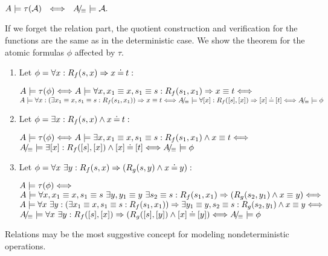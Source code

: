 \begin{THEOREM}\label{th:relcorrect}
$A\models \tau({\cal A})\ \ \mathrel{\Longleftrightarrow}\ \ A\!{\textstyle /}\!_\equiv\models {\cal A}.$ \end{THEOREM}
\begin{PROOF}
If we forget the relation part, the quotient construction and verification for the functions are the same as in the deterministic case. We show the theorem for the atomic formulas $\phi$ affected by $\tau$. \begin{enumerate}\MyLPar
\item Let $\phi = \forall x:R_{f}(s,x)\mathrel\Rightarrow x\mathbin{\doteq} t:$ 

$A\models \tau(\phi) \mathrel{\Longleftrightarrow}
A\models \forall x, x_1\equiv x, s_1\equiv s : R_{f}(s_1,x_1)\mathrel\Rightarrow x\equiv t
\mathrel{\Longleftrightarrow} $\\
$A\models \forall x:(\exists x_1\equiv x,s_1\equiv s : R_{f}(s_1,x_1))\mathrel\Rightarrow x\equiv t \mathrel{\Longleftrightarrow}
A\!{\textstyle /}\!_\equiv\models \forall [x]:R_{f}([s],[x])\mathrel\Rightarrow [x]\mathbin{\doteq} [t] \mathrel{\Longleftrightarrow} A\!{\textstyle /}\!_\equiv\models \phi$
\item Let $\phi = \exists x:R_{f}(s,x)\land x\mathbin{\doteq} t:$ 

$A\models \tau(\phi) \mathrel{\Longleftrightarrow} A\models \exists x, x_1\equiv x, s_1\equiv s: R_{f}(s_1,x_1) \land x\equiv t \mathrel{\Longleftrightarrow} $\\ $A\!{\textstyle /}\!_\equiv \models \exists [x]:R_{f}([s],[x])\land [x]\mathbin{\doteq} [t] \mathrel{\Longleftrightarrow} A\!{\textstyle /}\!_\equiv \models \phi$
\item Let $\phi = \forall x\ \exists y : 
R_{f}(s,x)\mathrel\Rightarrow (R_{g}(s,y)\land x\mathbin{\doteq} y):$ 

$A\models \tau(\phi) \mathrel{\Longleftrightarrow} $\\
$A\models \forall x,x_1\equiv x,s_1\equiv s\ \exists y,y_1\equiv y\ \exists s_2\equiv s :
\Pre Rf(s_1,x_1)\impl (\Pre Rg(s_2,y_1)\land x\equiv y) \ifff $\\ $A\models \forall x\ \exists y :(\exists x_1\equiv x,s_1\equiv s : R_{f}(s_1,x_1))\mathrel\Rightarrow \exists y_1\equiv y,s_2\equiv s : R_{g}(s_2,y_1)\land
x\equiv y \mathrel{\Longleftrightarrow} $\\
$A\!{\textstyle /}\!_\equiv \models \forall x\ \exists y : R_{f}([s],[x])\mathrel\Rightarrow 
(R_{g}([s],[y])\land [x]\mathbin{\doteq} [y]) \mathrel{\Longleftrightarrow} A\!{\textstyle /}\!_\equiv \models \phi $
\end{enumerate}
\end{PROOF}
Relations may be the most suggestive concept for modeling nondeterministic operations.

